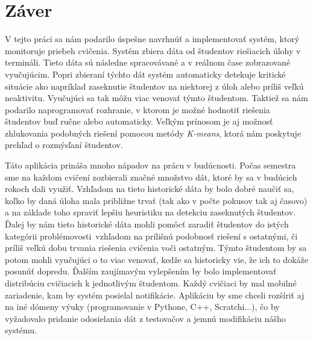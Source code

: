 \chapter*{Záver}  %

V tejto práci sa nám podarilo úspešne navrhnúť a implementovať systém, ktorý monitoruje
priebeh cvičenia. Systém zbiera dáta od študentov riešiacich úlohy v termináli.
Tieto dáta sú následne spracovávané a v reálnom čase zobrazované vyučujúcim.
Popri zbieraní týchto dát systém automaticky detekuje kritické situácie ako napríklad
zaseknutie študentov na niektorej z úloh alebo príliš veľkú neaktivitu. Vyučujúci
sa tak môžu viac venovať týmto študentom. Taktiež sa nám podarilo naprogramovať
rozhranie, v ktorom je možné hodnotiť riešenia študentov buď ručne alebo automaticky.
Veľkým prínosom je aj možnosť zhlukovania podobných riešení pomocou metódy
\textit{K-means}, ktorá nám poskytuje prehľad o rozmýsľaní študentov.

Táto aplikácia prináša mnoho nápadov na prácu v budúcnosti. Počas semestra
sme na každom cvičení zozbierali značné množstvo dát, ktoré by sa v budúcich rokoch
dali využiť.
Vzhľadom na tieto historické dáta by bolo dobré naučiť sa, koľko by daná úloha mala
približne trvať (tak ako v počte pokusov tak aj časovo) a na základe toho spraviť lepšiu
heuristiku na detekciu zaseknutých študentov.
Ďalej by nám tieto historické dáta mohli pomôcť zaradiť študentov do istých
\glqq kategórii problémovosti\grqq~vzhľadom na prílišnú podobnosť riešení s ostatnými,
či príliš veľkú dobu trvania riešenia cvičenia voči ostatným. Týmto študentom by sa
potom mohli vyučujúci o to viac venovať, kedže sa historicky vie, že ich to dokáže
posunúť dopredu. Ďalším zaujímavým vylepšením by bolo implementovať distribúciu cvičiacich
k jednotlivým
študentom. Každý cvičiaci by mal mobilné zariadenie, kam by systém posielal
notifikácie. Aplikáciu by sme chceli rozšíriť aj na iné dómeny výuky
(programovanie v Pythone, C++, Scratchi...), čo by vyžadovalo pridanie odosielania
dát z testovačov a jemnú modifikáciu nášho systému.





